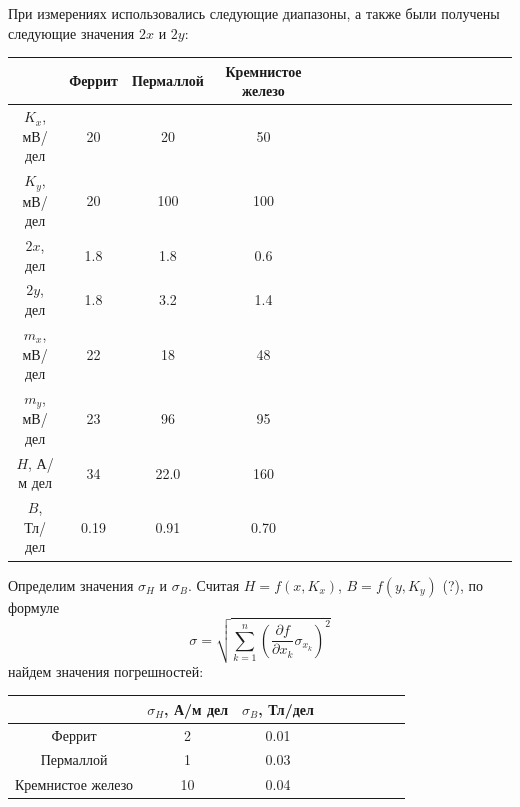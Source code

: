 \documentclass[14pt]{article}
\begin{document}

\vspace{1cm}
При измерениях использовались следующие диапазоны, а также были получены следующие значения $2x$ и $2y$:

\begin{center}
\begin{tabular}{|c|c|c|c|c|c|c|c|c|c|c|c|c|c|c|c|c|c|}
\hline
						&	Феррит		&	Пермаллой	&	Кремнистое железо	\\
\hline
$K_x$, мВ/дел			&	20			&	20			&	50					\\
\hline
$K_y$, мВ/дел			&	20			&	100			&	100					\\
\hline
$2x$, дел				&	1.8			&	1.8			&	0.6					\\
\hline
$2y$, дел				&	1.8			&	3.2			&	1.4					\\
\hline
$m_x$, мВ/дел			&	22			&	18			&	48					\\
\hline
$m_y$, мВ/дел			&	23			&	96			&	95					\\
\hline
$H$, А/м дел			&	34			&	22.0		&	160					\\
\hline
$B$, Тл/дел				&	0.19		&	0.91		&	0.70				\\
\hline
\end{tabular}
\end{center}

\vspace{1cm}
Определим значения $\sigma_H$ и $\sigma_B$. Считая $H = f(x, K_x)$, $B = f(y, K_y)$ (?), по формуле
$$
	\sigma = \sqrt{\sum_{k = 1}^n \left(\frac{\partial f}{\partial x_k}\sigma_{x_k}\right)^2}
$$
найдем значения погрешностей:
\begin{center}
\begin{tabular}{|c|c|c|c|c|c|c|c|c|}
\hline
					&	$\sigma_H$, А/м дел		&	$\sigma_B$, Тл/дел	\\
\hline
Феррит				&	2						&	0.01				\\
\hline
Пермаллой			&	1						&	0.03				\\
\hline
Кремнистое железо	&	10						&	0.04				\\
\hline
\end{tabular}
\end{center}
\end{document}
